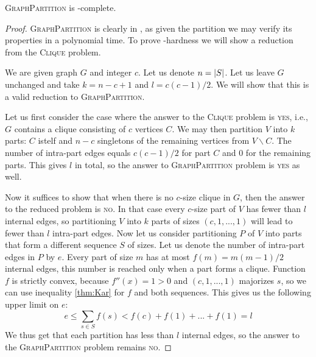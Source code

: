 \begin{thm} \label{gp-np}
\textsc{GraphPartition} is \np-complete.
\end{thm}

\begin{proof}
\textsc{GraphPartition} is clearly in \np,
as given the partition we may verify its properties in a polynomial time.
To prove \np-hardness we will show a reduction from the \textsc{Clique} problem.

We are given graph $G$ and integer $c$.
Let us denote $n = \left\vert S \right\vert$.
Let us leave $G$ unchanged and take $k = n-c+1$ and $l = c(c-1)/2$.
We will show that this is a valid reduction to \textsc{GraphPartition}.

Let us first consider the case where the answer to the \textsc{Clique} problem is \textsc{yes},
i.e., $G$ contains a clique consisting of $c$ vertices $C$.
We may then partition $V$ into $k$ parts:
$C$ istelf and $n-c$ singletons of the remaining vertices from $V \backslash C$.
The number of intra-part edges equals $c(c-1)/2$ for part $C$ and $0$ for the remaining parts.
This gives $l$ in total, so the answer to \textsc{GraphPartition} problem is \textsc{yes} as well.

Now it suffices to show that when there is no $c$-size clique in $G$,
then the answer to the reduced problem is \textsc{no}.
In that case every $c$-size part of $V$ has fewer than $l$ internal edges,
so partitioning $V$ into $k$ parts of sizes $(c, 1, ..., 1)$ will lead to fewer than $l$ intra-part edges.
Now let us consider partitioning $P$ of $V$ into parts that form a different sequence $S$ of sizes.
Let us denote the number of intra-part edges in $P$ by $e$.
Every part of size $m$ has at most $f(m) = m(m-1)/2$ internal edges,
this number is reached only when a part forms a clique.
Function $f$ is strictly convex, because $f''(x) = 1 > 0$ and $(c,1,...,1)$ majorizes $s$,
so we can use inequality \eqref{thm:Kar} for $f$ and both sequences.
This gives us the following upper limit on $e$:
$$e \leq \sum_{s\in{S}} f(s) < f(c) + f(1) + ... + f(1) = l$$
We thus get that each partition has less than $l$ internal edges,
so the answer to the \textsc{GraphPartition} problem remains \textsc{no}.
\end{proof}
